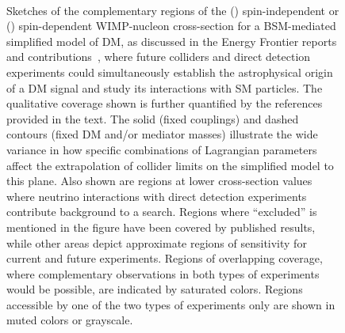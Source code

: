 \documentclass[nofootinbib]{article}
\begin{document}
\begin{figure}[htp]
\begin{center}
\\
\end{center}
\caption{Sketches of the complementary regions of the (\protect{}) spin-independent or (\protect{}) spin-dependent WIMP-nucleon cross-section for a BSM-mediated simplified model of DM, as discussed in the Energy Frontier reports and contributions~\cite{Bose:2022obr,Energy-Frontier-Report,Boveia:2022jox}, where future colliders and direct detection experiments could simultaneously establish the astrophysical origin of a DM signal and study its interactions with SM particles. The qualitative coverage shown is further quantified by the references provided in the text.
The solid (fixed couplings) and dashed contours (fixed DM and/or mediator masses) illustrate the wide variance in how specific combinations of Lagrangian parameters affect the extrapolation of collider limits on the simplified model to this plane.
Also shown are regions at lower cross-section values where neutrino interactions with direct detection experiments contribute background to a search.
Regions where “excluded” is mentioned in the figure have been covered by published results, while other areas depict approximate regions of sensitivity for current and future experiments. 
Regions of overlapping coverage, where complementary observations in both types of experiments would be possible, are indicated by saturated colors. Regions accessible by one of the two types of experiments only are shown in muted colors or grayscale.
}
\label{fig:BSMMediatorDD}
\end{figure}
\end{document}
